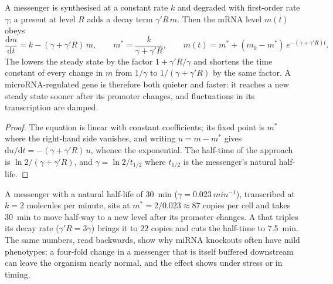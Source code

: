 \begin{theorem}\label{thm:b3:rna-regulation:mirna-kinetics}
A messenger is synthesised at a constant rate $k$ and degraded with
first-order rate $\gamma$; a  present at level $R$ adds a decay
term $\gamma' R\, m$. Then the mRNA level $m(t)$ obeys
\[
\frac{\mathrm{d}m}{\mathrm{d}t} = k - (\gamma + \gamma' R)\, m,
\qquad
m^{*} = \frac{k}{\gamma + \gamma' R},
\qquad
m(t) = m^{*} + (m_{0} - m^{*})\,e^{-(\gamma + \gamma' R)t}.
\]
The  lowers the steady state by the factor $1 + \gamma' R/
\gamma$ and shortens the time constant of every change in $m$ from
$1/\gamma$ to $1/(\gamma + \gamma' R)$ by the same factor. A
microRNA-regulated gene is therefore both quieter and faster: it
reaches a new steady state sooner after its promoter changes, and
fluctuations in its transcription are damped.
\end{theorem}
\begin{proof}
The equation is linear with constant coefficients; its fixed point is
$m^{*}$ where the right-hand side vanishes, and writing $u = m - m^{*}$
gives $\mathrm{d}u/\mathrm{d}t = -(\gamma + \gamma' R)\,u$, whence the
exponential. The half-time of the approach is $\ln 2/(\gamma + \gamma'
R)$, and $\gamma = \ln 2 / t_{1/2}$ where $t_{1/2}$ is the messenger's
natural half-life.
\end{proof}

\begin{example}\label{ex:b3:rna-regulation:fourfold}
A messenger with a natural half-life of \qty{30}{min} ($\gamma =
\qty{0.023}{min^{-1}}$), transcribed at $k = 2$ molecules per minute,
sits at $m^{*} = 2/0.023 \approx 87$ copies per cell and takes
\qty{30}{min} to move half-way to a new level after its promoter
changes. A  that triples its decay rate ($\gamma' R = 3\gamma$)
brings it to $22$ copies and cuts the half-time to \qty{7.5}{min}. The
same numbers, read backwards, show why miRNA knockouts often have mild
phenotypes: a four-fold change in a messenger that is itself buffered
downstream can leave the organism nearly normal, and the effect shows
under stress or in timing.
\end{example}

